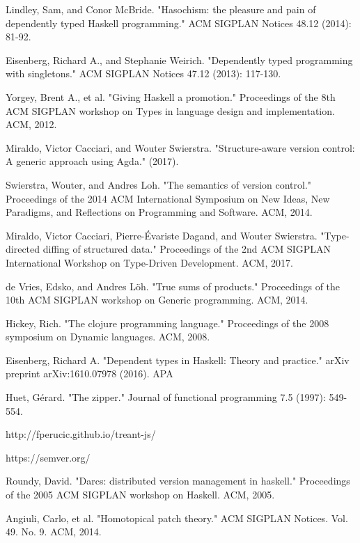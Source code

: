 \documentclass[11pt, titlepage]{article}
\begin{document}
\begin{thebibliography}{30}  
  Lindley, Sam, and Conor McBride. "Hasochism: the pleasure and pain of dependently typed Haskell programming." ACM SIGPLAN Notices 48.12 (2014): 81-92.

 Eisenberg, Richard A., and Stephanie Weirich. "Dependently typed programming with singletons." ACM SIGPLAN Notices 47.12 (2013): 117-130.
  
 Yorgey, Brent A., et al. "Giving Haskell a promotion." Proceedings of the 8th ACM SIGPLAN workshop on Types in language design and implementation. ACM, 2012.
  
   Miraldo, Victor Cacciari, and Wouter Swierstra. "Structure-aware version control: A generic approach using Agda." (2017).

   Swierstra, Wouter, and Andres Loh. "The semantics of version control." Proceedings of the 2014 ACM International Symposium on New Ideas, New Paradigms, and Reflections on Programming and Software. ACM, 2014.

  Miraldo, Victor Cacciari, Pierre-Évariste Dagand, and Wouter Swierstra. "Type-directed diffing of structured data." Proceedings of the 2nd ACM SIGPLAN International Workshop on Type-Driven Development. ACM, 2017.
  
  de Vries, Edsko, and Andres Löh. "True sums of products." Proceedings of the 10th ACM SIGPLAN workshop on Generic programming. ACM, 2014.
  
Hickey, Rich. "The clojure programming language." Proceedings of the 2008 symposium on Dynamic languages. ACM, 2008.

 Eisenberg, Richard A. "Dependent types in Haskell: Theory and practice." arXiv preprint arXiv:1610.07978 (2016). APA	

 Huet, Gérard. "The zipper." Journal of functional programming 7.5 (1997): 549-554.

 http://fperucic.github.io/treant-js/

 https://semver.org/

 Roundy, David. "Darcs: distributed version management in haskell." Proceedings of the 2005 ACM SIGPLAN workshop on Haskell. ACM, 2005.

 Angiuli, Carlo, et al. "Homotopical patch theory." ACM SIGPLAN Notices. Vol. 49. No. 9. ACM, 2014.


\end{thebibliography}
\end{document}

